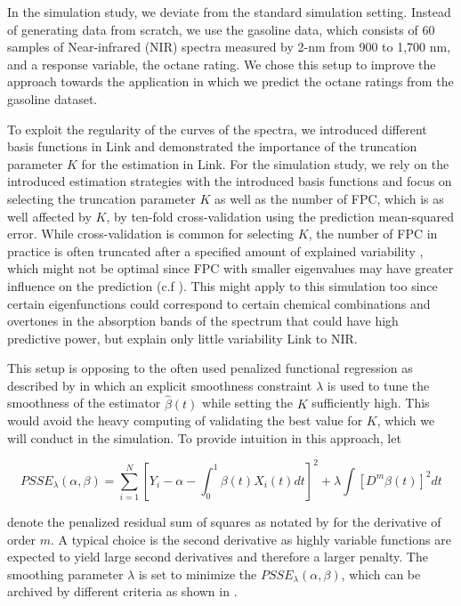 \documentclass[11pt,twoside,a4paper]{article}
\begin{document}
	In the simulation study, we deviate from the standard simulation setting. Instead of generating data from scratch, we use the gasoline data, which consists of 60 samples of Near-infrared (NIR) spectra measured by 2-nm from 900 to 1,700 nm, and a response variable,  the octane rating. We chose this setup to improve the approach towards the application in which we  predict the octane ratings from the gasoline dataset.	
	
	To exploit the regularity of the curves of the spectra, we introduced different basis functions in {\color{green} Link} and demonstrated the importance of the truncation parameter $K$ for the estimation in {\color{green} Link}. For the simulation study, we rely on the introduced estimation strategies with the introduced basis functions and focus on selecting the truncation parameter $K$ as well as the number of FPC, which is as well affected by $K$, by ten-fold cross-validation using the prediction mean-squared error. While cross-validation is common for selecting $K$, the number of FPC in practice is often truncated after a specified amount of explained variability \cite{kokoszka_introduction_2017}, which might not be optimal since FPC with smaller eigenvalues may have greater influence on the prediction (c.f \cite{Jolliffe_1982}). This might apply to this simulation too since certain eigenfunctions could correspond to certain chemical combinations and overtones in the absorption bands of the spectrum that could have high predictive power, but explain only little variability {\color{green} Link to NIR}.
	 
	This setup is opposing to the often used penalized functional regression as described by \cite{Goldsmith_2011} in which an explicit smoothness constraint $\lambda$ is used to tune the smoothness of the estimator $\hat{\beta}(t)$ while setting the $K$ sufficiently high. This would avoid the heavy computing of validating the best value for $K$, which we will conduct in the simulation. To provide intuition in this approach, let 
	
	 \begin{equation}
	 	PSSE_\lambda(\alpha, \beta) = \sum_{i = 1}^{N} \left[ Y_i -\alpha -\int_0^1 \beta(t)X_i(t)dt \right]^2 + \lambda \int \left[D^m\beta(t)\right]^2 dt
	 \end{equation}
 
	 denote the penalized residual sum of squares as notated by \cite{ramsay_functional_2005} for the derivative of order $m$. A typical choice is the second derivative as highly variable functions are expected to yield large second derivatives and therefore a larger penalty. The smoothing parameter $\lambda$ is set to minimize the $PSSE_\lambda(\alpha, \beta)$, which can be archived by different criteria as shown in \cite{ThomasLee_2003}.
		
\end{document}
